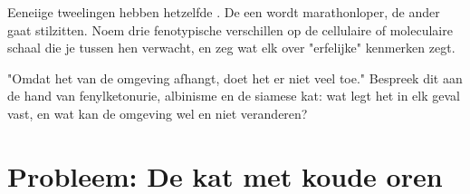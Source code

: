 \begin{exercise}[$\star\star\star$]\label{exo:g11:enzymes-and-phenotype:14}
Eeneiige tweelingen hebben hetzelfde . De een wordt
marathonloper, de ander gaat stilzitten. Noem drie fenotypische
verschillen op de cellulaire of moleculaire schaal die je tussen hen
verwacht, en zeg wat elk over "erfelijke" kenmerken zegt.
\end{exercise}

\begin{exercise}[$\star\star\star$]\label{exo:g11:enzymes-and-phenotype:15}
"Omdat het  van de omgeving afhangt, doet het  er niet
veel toe." Bespreek dit aan de hand van fenylketonurie, albinisme en de
siamese kat: wat legt het  in elk geval vast, en wat kan de
omgeving wel en niet veranderen?
\end{exercise}

\section{Probleem: De kat met koude oren}

